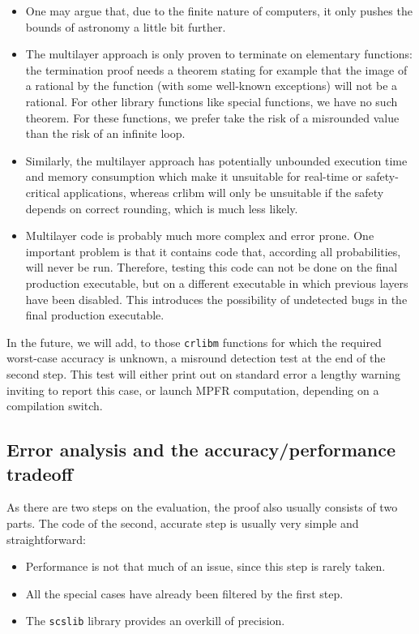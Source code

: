 \begin{itemize}

\item One may argue that, due to the finite nature of computers, it
  only pushes the bounds of astronomy a little bit further.

\item The multilayer approach is only proven to terminate on
  elementary functions: the termination proof needs a theorem stating
  for example that the image of a rational by the function (with some
  well-known exceptions) will not be a rational. For other library
  functions like  special functions, we have no such theorem.
  For these functions, we prefer take the risk of a misrounded
  value than the risk of an infinite loop.

\item Similarly, the multilayer approach has potentially unbounded
  execution time and memory consumption which make it unsuitable for
  real-time or safety-critical applications, whereas crlibm will only
  be unsuitable if the safety depends on correct rounding, which is
  much less likely.

\item Multilayer code is probably much more complex and error prone.
  One important problem is that it contains code that, according all
  probabilities, will never be run. Therefore, testing this code can
  not be done on the final production executable, but on a different
  executable in which previous layers have been disabled. This
  introduces the possibility of undetected bugs in the final
  production executable.

\end{itemize}

In the future, we will add, to those \texttt{crlibm} functions for
which the required worst-case accuracy is unknown, a misround
detection test at the end of the second step. This test will either
print out on standard error a lengthy warning inviting to report this
case, or launch MPFR computation, depending on a compilation switch.




\subsection{Error analysis and the accuracy/performance tradeoff
  \label{sec:error-accuracy-perf}}

As there are two steps on the evaluation, the proof also usually
consists of two parts. The code of the second, accurate step is
usually very simple and straightforward:
\begin{itemize}
\item Performance is not that much of an issue, since this step is rarely taken.
\item All the special cases have already been filtered by the first step.
\item The \texttt{scslib} library provides an overkill of precision.
\end{itemize}


